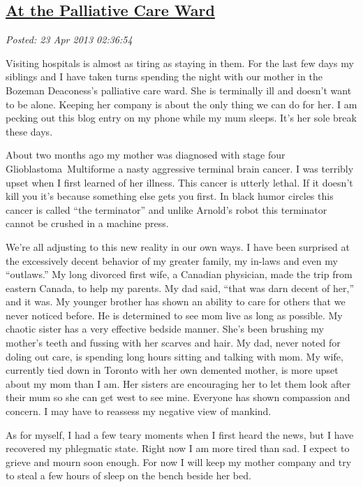 %

\subsection*{\href{http://bakerjd99.wordpress.com/2013/04/22/at-the-palliative-care-ward/}{At the Palliative Care Ward}}


\noindent\emph{Posted: 23 Apr 2013 02:36:54}
\vspace{6pt}

Visiting hospitals is almost as tiring as staying in them. For the last
few days my siblings and I have taken turns spending the night with our
mother in the Bozeman Deaconess's palliative care ward. She is
terminally ill and doesn't want to be alone. Keeping her company is
about the only thing we can do for her. I am pecking out this blog entry
on my phone while my mum sleeps. It's her sole break these days.

About two months ago my mother was diagnosed with stage four
Glioblastoma~Multiforme a nasty aggressive terminal brain cancer. I was
terribly upset when I first learned of her illness. This cancer is
utterly lethal. If it doesn't kill you it's because something else gets
you first. In black humor circles this cancer is called ``the
terminator'' and unlike Arnold's robot this terminator cannot be crushed
in a machine press.

We're all adjusting to this new reality in our own ways. I have been
surprised at the excessively decent behavior of my greater family, my
in-laws and even my ``outlaws.'' My long divorced first wife, a Canadian
physician, made the trip from eastern Canada, to help my parents. My dad
said, ``that was darn decent of her,'' and it was. My younger brother
has shown an ability to care for others that we never noticed before. He
is determined to see mom live as long as possible. My chaotic sister has
a very effective bedside manner. She's been brushing my mother's teeth
and fussing with her scarves and hair. My dad, never noted for doling
out care, is spending long hours sitting and talking with mom. My wife,
currently tied down in Toronto with her own demented mother, is more
upset about my mom than I am. Her sisters are encouraging her to let
them look after their mum so she can get west to see mine. Everyone has
shown compassion and concern. I may have to reassess my negative view of
mankind.

As for myself, I had a few teary moments when I first heard the news,
but I have recovered my phlegmatic state. Right now I am more tired than
sad. I expect to grieve and mourn soon enough. For now I will keep my
mother company and try to steal a few hours of sleep on the bench beside
her bed.



%